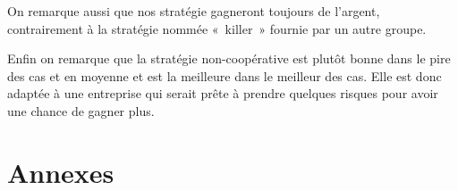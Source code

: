 \documentclass{scrartcl}
\begin{document}
    On remarque aussi que nos stratégie gagneront toujours de l'argent,
    contrairement à la stratégie nommée «~killer~» fournie par un autre groupe.

    Enfin on remarque que la stratégie non-coopérative est plutôt bonne dans le
    pire des cas et en moyenne et est la meilleure dans le meilleur des cas.
    Elle est donc adaptée à une entreprise qui serait prête à prendre quelques
    risques pour avoir une chance de gagner plus.
    
\section{Annexes}
  \lstlistoflistings
  
  
  
  
  
  
  
\end{document}
